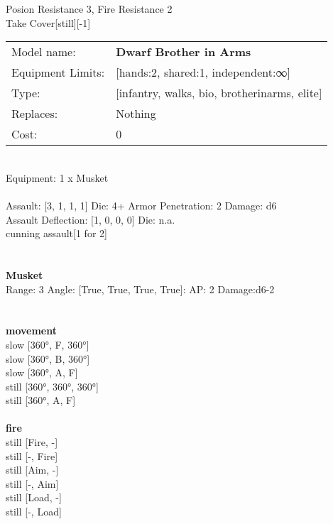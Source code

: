 \noindent Posion Resistance 3, Fire Resistance 2\\ 
Take Cover[still][-1]\\ 


\noindent
\begin{tabular}{ll}
Model name: &{\bf Dwarf Brother in Arms } \\
Equipment Limits: &[hands:2, shared:1, independent:∞] \\
Type: &[infantry, walks, bio, brotherinarms, elite] \\
Replaces: &Nothing \\
Cost: & 0\\
\end{tabular}
\ \\
Equipment: 1 x Musket \\
\ \\
Assault: [3, 1, 1, 1] Die: 4+ Armor Penetration: 2 Damage: d6 \\
Assault Deflection: [1, 0, 0, 0] Die: n.a.\\
\indent cunning assault[1 for 2]\\ 
 
\ \\

\ \\
{\bf Musket } \\



Range: 3  Angle: [True, True, True, True]: AP: 2 Damage:d6-2 \\




 
\ \\



\ \\ {\bf movement } \\
slow [360°, F, 360°] \\
slow [360°, B, 360°] \\
slow [360°, A, F] \\
still [360°, 360°, 360°] \\
still [360°, A, F] \\
\ \\ {\bf fire } \\
still [Fire, -] \\
still [-, Fire] \\
still [Aim, -] \\
still [-, Aim] \\
still [Load, -] \\
still [-, Load] \\


